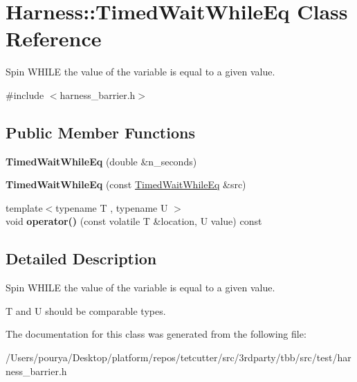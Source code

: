 \hypertarget{classHarness_1_1TimedWaitWhileEq}{}\section{Harness\+:\+:Timed\+Wait\+While\+Eq Class Reference}
\label{classHarness_1_1TimedWaitWhileEq}


Spin W\+H\+I\+L\+E the value of the variable is equal to a given value.  




{\ttfamily \#include $<$harness\+\_\+barrier.\+h$>$}

\subsection*{Public Member Functions}
\begin{DoxyCompactItemize}
\item 
\hypertarget{classHarness_1_1TimedWaitWhileEq_a34da6cb328a98ab88513dbeb63fd937a}{}{\bfseries Timed\+Wait\+While\+Eq} (double \&n\+\_\+seconds)\label{classHarness_1_1TimedWaitWhileEq_a34da6cb328a98ab88513dbeb63fd937a}

\item 
\hypertarget{classHarness_1_1TimedWaitWhileEq_a01245832d212134b855460bcfb4bfe1c}{}{\bfseries Timed\+Wait\+While\+Eq} (const \hyperlink{classHarness_1_1TimedWaitWhileEq}{Timed\+Wait\+While\+Eq} \&src)\label{classHarness_1_1TimedWaitWhileEq_a01245832d212134b855460bcfb4bfe1c}

\item 
\hypertarget{classHarness_1_1TimedWaitWhileEq_a47b1eb64f2c7fb8833ea143aaed210b4}{}{\footnotesize template$<$typename T , typename U $>$ }\\void {\bfseries operator()} (const volatile T \&location, U value) const \label{classHarness_1_1TimedWaitWhileEq_a47b1eb64f2c7fb8833ea143aaed210b4}

\end{DoxyCompactItemize}


\subsection{Detailed Description}
Spin W\+H\+I\+L\+E the value of the variable is equal to a given value. 

T and U should be comparable types. 

The documentation for this class was generated from the following file\+:\begin{DoxyCompactItemize}
\item 
/\+Users/pourya/\+Desktop/platform/repos/tetcutter/src/3rdparty/tbb/src/test/harness\+\_\+barrier.\+h\end{DoxyCompactItemize}
